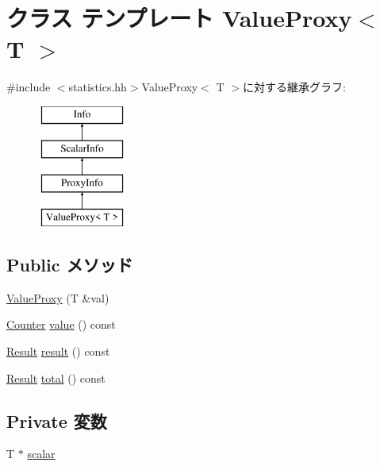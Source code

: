 \hypertarget{classStats_1_1ValueProxy}{
\section{クラス テンプレート ValueProxy$<$ T $>$}
\label{classStats_1_1ValueProxy}
}


{\ttfamily \#include $<$statistics.hh$>$}ValueProxy$<$ T $>$に対する継承グラフ:\begin{figure}[H]
\begin{center}
\leavevmode
\includegraphics[height=4cm]{classStats_1_1ValueProxy}
\end{center}
\end{figure}
\subsection*{Public メソッド}
\begin{DoxyCompactItemize}
\item 
\hyperlink{classStats_1_1ValueProxy_a9760e2c14afd730dd4a2ac1287431afb}{ValueProxy} (T \&val)
\item 
\hyperlink{namespaceStats_ac35128c026c72bb36af9cea00774e8a6}{Counter} \hyperlink{classStats_1_1ValueProxy_aa9e486cb7eb0ad44f5f89923594b68a4}{value} () const 
\item 
\hyperlink{namespaceStats_ad874d2cfd4b4a29ebd480bb2e67f20ae}{Result} \hyperlink{classStats_1_1ValueProxy_ae050da86c3d8e8a677a0bdeb7971e1e3}{result} () const 
\item 
\hyperlink{namespaceStats_ad874d2cfd4b4a29ebd480bb2e67f20ae}{Result} \hyperlink{classStats_1_1ValueProxy_a35c6e2ed3fc81b40d69052a062113ead}{total} () const 
\end{DoxyCompactItemize}
\subsection*{Private 変数}
\begin{DoxyCompactItemize}
\item 
T $\ast$ \hyperlink{classStats_1_1ValueProxy_a40439de2c1c4f0a5e1b1fa557cc69c0e}{scalar}
\end{DoxyCompactItemize}
